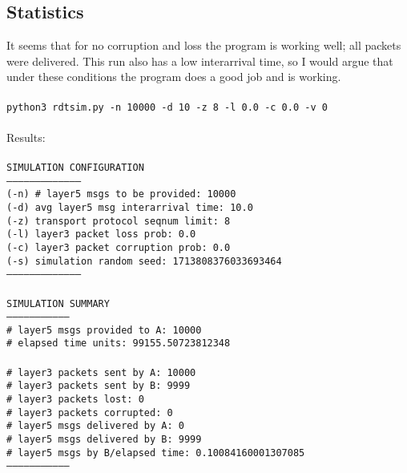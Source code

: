 \documentclass{article}
\begin{document}
\subsection{Statistics}
It seems that for no corruption and loss the program is working well; all
packets were delivered. This run also has a low interarrival time, so I would
argue that under these conditions the program does a good job and is working.
\\\\
\hspace*{10mm} \texttt{python3 rdtsim.py -n 10000 -d 10 -z 8 -l 0.0 -c 0.0 -v 0}\\\\
Results: \\
\texttt{ \\
SIMULATION CONFIGURATION\\
--------------------------------------\\
(-n) \# layer5 msgs to be provided:      10000\\
(-d) avg layer5 msg interarrival time:  10.0\\
(-z) transport protocol seqnum limit:   8\\
(-l) layer3 packet loss prob:           0.0\\
(-c) layer3 packet corruption prob:     0.0\\
(-s) simulation random seed:            1713808376033693464\\
--------------------------------------\\
\\
SIMULATION SUMMARY\\
--------------------------------\\
\# layer5 msgs provided to A:      10000\\
\# elapsed time units:             99155.50723812348\\
\\
\# layer3 packets sent by A:       10000\\
\# layer3 packets sent by B:       9999\\
\# layer3 packets lost:            0\\
\# layer3 packets corrupted:       0\\
\# layer5 msgs delivered by A:     0\\
\# layer5 msgs delivered by B:     9999\\
\# layer5 msgs by B/elapsed time:  0.10084160001307085\\
--------------------------------\\
}
\end{document}
